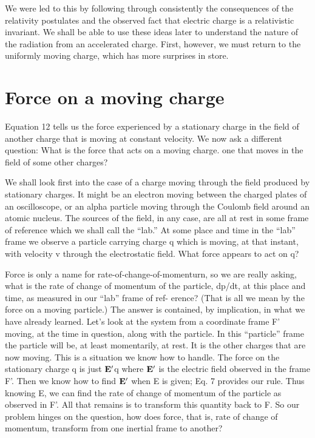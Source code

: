 We were led to this by following through consistently the consequences
of the relativity postulates and the observed fact that electric
charge is a relativistic invariant. We shall be able to use these ideas
later to understand the nature of the radiation from an accelerated
charge. First, however, we must return to the uniformly moving
charge, which has more surprises in store.

\section{Force on a moving charge}

Equation 12 tells us the force experienced by a stationary charge
in the field of another charge that is moving at constant velocity.
We now ask a different question: What is the force that acts on a
moving charge. one that moves in the field of some other charges?

We shall look first into the case of a charge moving through the field
produced by stationary charges. It might be an electron moving
between the charged plates of an oscilloscope, or an alpha particle
moving through the Coulomb field around an atomic nucleus. The
sources of the field, in any case, are all at rest in some frame of reference
which we shall call the ``lab.'' At some place and time in the
``lab'' frame we observe a particle carrying charge q which is moving,
at that instant, with velocity v through the electrostatic field. What
force appears to act on q?

Force is only a name for rate-of-change-of-momenturn, so we are
really asking, what is the rate of change of momentum of the particle,
dp/dt, at this place and time, as measured in our ``lab'' frame of ref-
erence? (That is all we mean by the force on a moving particle.)
The answer is contained, by implication, in what we have already
learned. Let's look at the system from a coordinate frame F' moving,
at the time in question, along with the particle. In this ``particle''
frame the particle will be, at least momentarily, at rest. It is the
other charges that are now moving. This is a situation we know
how to handle. The force on the stationary charge q is just $\mathbf{E}'$q where
$\mathbf{E}'$ is the electric field observed in the frame F'. Then we know how
to find $\mathbf{E}'$ when E is given; Eq. 7 provides our rule. Thus knowing
E, we can find the rate of change of momentum of the particle as
observed in F'. All that remains is to transform this quantity back
to F. So our problem hinges on the question, how does force, that
is, rate of change of momentum, transform from one inertial frame
to another?

